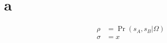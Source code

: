 \documentclass{article}
\begin{document}
\section{a}
\begin{equation}\begin{aligned}
\rho &= \Pr(s_A,s_B | \Omega) \\
\sigma &= x
\end{aligned}\end{equation}
\end{document}
